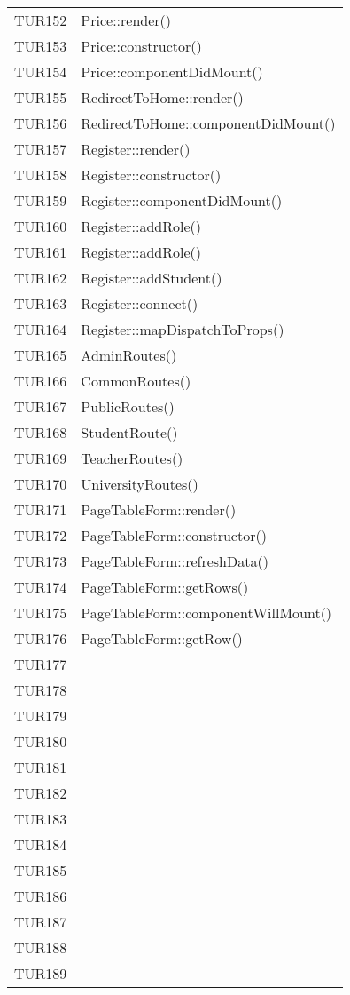 \documentclass[PianoDiQualifica.tex]{subfiles}
\begin{document}
\begin{longtable}[H]{P{5cm}P{9cm}}
	TUR152 & Price::render() \\ 
	TUR153 & Price::constructor() \\ 
	TUR154 & Price::componentDidMount() \\ 
	TUR155 & RedirectToHome::render() \\ 
	TUR156 & RedirectToHome::componentDidMount() \\ 
	TUR157 & Register::render() \\ 
	TUR158 & Register::constructor() \\ 
	TUR159 & Register::componentDidMount() \\ 
	TUR160 & Register::addRole() \\ 
	TUR161 & Register::addRole() \\ 
	TUR162 & Register::addStudent() \\ 
	TUR163 & Register::connect() \\ 
	TUR164 & Register::mapDispatchToProps() \\ 
	TUR165 & AdminRoutes() \\ 
	TUR166 & CommonRoutes() \\ 
	TUR167 & PublicRoutes() \\ 
	TUR168 & StudentRoute() \\ 
	TUR169 & TeacherRoutes() \\ 
	TUR170 & UniversityRoutes() \\ 
	TUR171 & PageTableForm::render() \\ 
	TUR172 & PageTableForm::constructor() \\ 
	TUR173 & PageTableForm::refreshData() \\ 
	TUR174 & PageTableForm::getRows() \\ 
	TUR175 & PageTableForm::componentWillMount() \\ 
	TUR176 & PageTableForm::getRow() \\
	TUR177 &  \\
	TUR178 &  \\
	TUR179 &  \\
	TUR180 &  \\
	TUR181 &  \\
	TUR182 &  \\
	TUR183 &  \\
	TUR184 &  \\
	TUR185 &  \\
	TUR186 &  \\
	TUR187 &  \\
	TUR188 &  \\
	TUR189 &  \\

\end{longtable}
\end{document}
